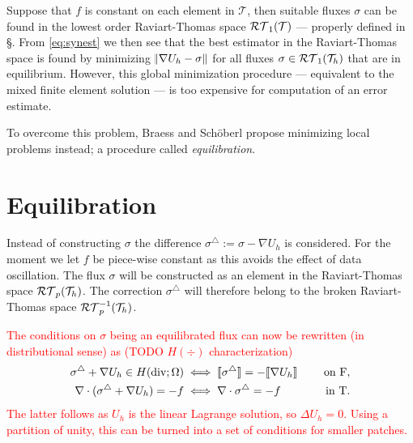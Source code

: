 \documentclass[thesis.tex]{subfiles}
\begin{document}
Suppose that $f$ is constant on each element in $\mathcal{T}$, then suitable fluxes $\sigma$ can be 
found in the lowest order Raviart-Thomas space $\mathcal{RT}_1(\mathcal{T})$ --- properly defined in \S {}.
From \eqref{eq:synest} we then see that 
the best estimator in the Raviart-Thomas space is found by minimizing $\norm{\nabla U_h - \sigma}$ for all 
fluxes $\sigma \in \mathcal{RT}_1(\mathcal{T}_h)$ that are in equilibrium. However,
this global minimization procedure --- equivalent to the mixed finite element solution --- 
is too expensive for computation of an error estimate.

To overcome this problem, Braess and Sch\"oberl \cite{braessequil} propose minimizing local problems instead; a procedure
called \emph{equilibration}.

\section{Equilibration} 
Instead of constructing $\sigma$ the difference $\sigma^\triangle := \sigma - \nabla U_h$ is considered.
For the moment we let  $f$ be piece-wise constant as this avoids the effect of data oscillation.
The flux $\sigma$ will be constructed as an element in the 
Raviart-Thomas space $\mathcal{RT}_p(\mathcal{T}_h)$. The correction $\sigma^\triangle$ will therefore belong to the broken Raviart-Thomas space $\mathcal{RT}_p^{-1}(\mathcal{T}_h)$.

\textcolor{red}{
The conditions on $\sigma$ being an equilibrated flux can now be rewritten (in distributional sense) as (TODO $H(\div)$ characterization) 
\begin{alignat*}{2}
  \sigma^\triangle + \nabla U_h \in H(\operatorname{div}; \Omega) &\iff \llbracket \sigma^\triangle  \rrbracket = -\llbracket \nabla U_h \rrbracket & \quad \text{ on F},\\
  \nabla \cdot ( \sigma^\triangle + \nabla U_h) = -f &\iff \nabla \cdot \sigma^\triangle = -f & \quad \text{ in T}.
\end{alignat*}
The latter follows as $U_h$ is the linear Lagrange solution, so  $\Delta U_h = 0$. Using a partition of unity, this can be turned into
a set of conditions for smaller patches.
}
\end{document}
